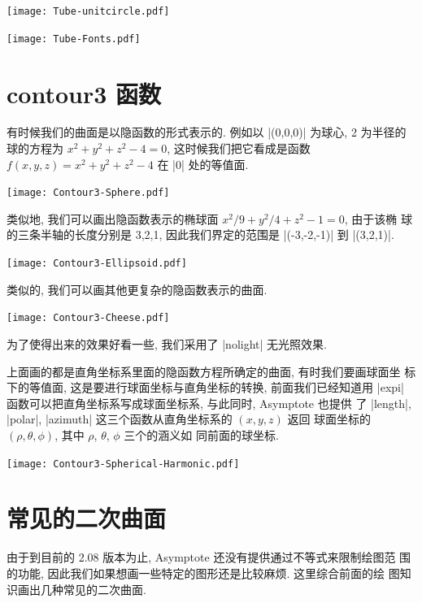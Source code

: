 \documentclass[nofonts,CJKnormalspaces]{ctexbook}
\begin{document}
\begin{center}\texttt{[image: Tube-unitcircle.pdf]}\end{center}%


\begin{center}\texttt{[image: Tube-Fonts.pdf]}\end{center}%


\section{contour3 函数}
有时候我们的曲面是以隐函数的形式表示的. 例如以 |(0,0,0)| 为球心, 2 为半径的球的方程为
$x^2+y^2+z^2-4=0$, 这时候我们把它看成是函数
$f(x,y,z)=x^{2}+y^{2}+z^{2}-4$ 在 |0| 处的等值面.
\begin{center}\texttt{[image: Contour3-Sphere.pdf]}\end{center}%

类似地, 我们可以画出隐函数表示的椭球面 $x^2/9+y^2/4+z^2-1=0$, 由于该椭
球的三条半轴的长度分别是 3,2,1, 因此我们界定的范围是 |(-3,-2,-1)| 到
|(3,2,1)|.
\begin{center}\texttt{[image: Contour3-Ellipsoid.pdf]}\end{center}%

类似的, 我们可以画其他更复杂的隐函数表示的曲面.
\begin{center}\texttt{[image: Contour3-Cheese.pdf]}\end{center}%

为了使得出来的效果好看一些, 我们采用了 |nolight| 无光照效果.

上面画的都是直角坐标系里面的隐函数方程所确定的曲面, 有时我们要画球面坐
标下的等值面, 这是要进行球面坐标与直角坐标的转换, 前面我们已经知道用
|expi| 函数可以把直角坐标系写成球面坐标系, 与此同时, Asymptote 也提供
了 |length|, |polar|, |azimuth| 这三个函数从直角坐标系的 $(x,y,z)$ 返回
球面坐标的 $(\rho,\theta,\phi)$, 其中 $\rho$, $\theta$, $\phi$ 三个的涵义如
同前面的球坐标.
\begin{center}\texttt{[image: Contour3-Spherical-Harmonic.pdf]}\end{center}%


\section{常见的二次曲面}
由于到目前的 2.08 版本为止, Asymptote 还没有提供通过不等式来限制绘图范
围的功能, 因此我们如果想画一些特定的图形还是比较麻烦. 这里综合前面的绘
图知识画出几种常见的二次曲面.
\end{document}
